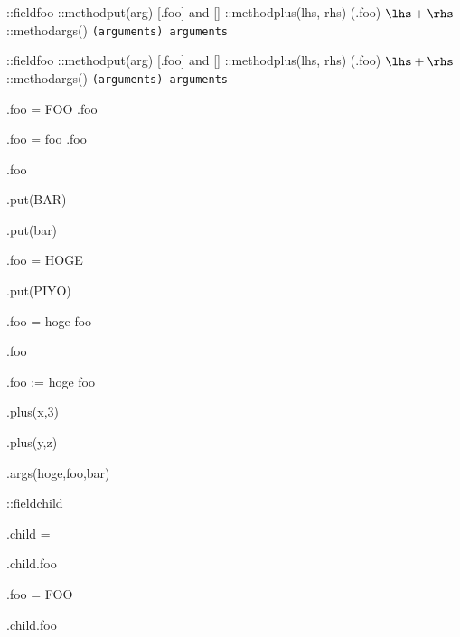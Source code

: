 \documentclass{jarticle}
\begin{document}
\def\describe#1{\texttt{(#1) \expandafter\meaning\csname #1\endcsname}}

\def\constructor#1{
  \def#1{}
  \object::field#1{foo}
  \object::method#1put(arg) {
    [\this.foo] and [\arg]
  }
  \object::method#1plus(lhs, rhs) {
    (\this.foo) $\lhs+\rhs$
  }
  \object::method#1args() {
    \describe{arguments}
  }
}

\constructor\obj
\constructor\obk

\obj.foo = {FOO}
\obj.foo

\obk.foo = {foo}
\obk.foo

\obj.foo

\obj.put(BAR)

\obk.put(bar)

\obj.foo = {HOGE}

\obj.put(PIYO)

\def\tmp{hoge foo}

\obj.foo = \tmp

\obj.foo

\obj.foo := \tmp

\obj.plus(x,3)

\obk.plus(y,z)

\obj.args(hoge,foo,bar)

\object::field\obj{child}

\obj.child = \obk

\obj.child.foo

\obk.foo = {FOO}

\obj.child.foo
\end{document}
